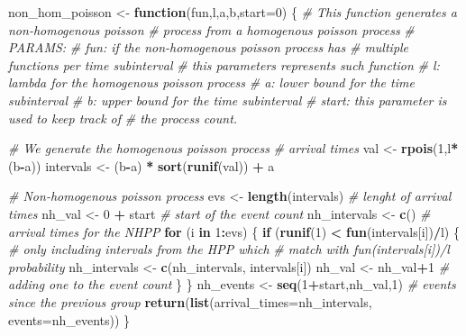 \documentclass[]{article}
\newenvironment{Shaded}{\begin{snugshade}}{\end{snugshade}}
\newcommand{\CommentTok}[1]{\textcolor[rgb]{0.56,0.35,0.01}{\textit{#1}}}
\newcommand{\ControlFlowTok}[1]{\textcolor[rgb]{0.13,0.29,0.53}{\textbf{#1}}}
\newcommand{\DataTypeTok}[1]{\textcolor[rgb]{0.13,0.29,0.53}{#1}}
\newcommand{\DecValTok}[1]{\textcolor[rgb]{0.00,0.00,0.81}{#1}}
\newcommand{\KeywordTok}[1]{\textcolor[rgb]{0.13,0.29,0.53}{\textbf{#1}}}
\newcommand{\NormalTok}[1]{#1}
\newcommand{\OperatorTok}[1]{\textcolor[rgb]{0.81,0.36,0.00}{\textbf{#1}}}
\newcommand{\StringTok}[1]{\textcolor[rgb]{0.31,0.60,0.02}{#1}}
\begin{document}
\begin{Shaded}
\begin{Highlighting}[]
\NormalTok{non_hom_poisson <-}\StringTok{ }\ControlFlowTok{function}\NormalTok{(fun,l,a,b,}\DataTypeTok{start=}\DecValTok{0}\NormalTok{) \{}
    \CommentTok{# This function generates a non-homogenous poisson }
    \CommentTok{# process from a homogenous poisson process}
    \CommentTok{# PARAMS:}
    \CommentTok{# fun:   if the non-homogenous poisson process has}
    \CommentTok{#        multiple functions per time subinterval}
    \CommentTok{#        this parameters represents such function}
    \CommentTok{# l:     lambda for the homogenous poisson process}
    \CommentTok{# a:     lower bound for the time subinterval}
    \CommentTok{# b:     upper bound for the time subinterval}
    \CommentTok{# start: this parameter is used to keep track of }
    \CommentTok{#        the process count.}
    
    \CommentTok{# We generate the homogenous poisson process }
    \CommentTok{# arrival times}
\NormalTok{    val <-}\StringTok{ }\KeywordTok{rpois}\NormalTok{(}\DecValTok{1}\NormalTok{,l}\OperatorTok{*}\NormalTok{(b}\OperatorTok{-}\NormalTok{a))}
\NormalTok{    intervals <-}\StringTok{ }\NormalTok{(b}\OperatorTok{-}\NormalTok{a) }\OperatorTok{*}\StringTok{ }\KeywordTok{sort}\NormalTok{(}\KeywordTok{runif}\NormalTok{(val)) }\OperatorTok{+}\StringTok{ }\NormalTok{a}

    \CommentTok{# Non-homogenous poisson process}
\NormalTok{    evs <-}\StringTok{ }\KeywordTok{length}\NormalTok{(intervals) }\CommentTok{# lenght of arrival times }
\NormalTok{    nh_val <-}\StringTok{ }\DecValTok{0} \OperatorTok{+}\StringTok{ }\NormalTok{start }\CommentTok{# start of the event count}
\NormalTok{    nh_intervals <-}\StringTok{ }\KeywordTok{c}\NormalTok{() }\CommentTok{# arrival times for the NHPP}
    \ControlFlowTok{for}\NormalTok{ (i }\ControlFlowTok{in} \DecValTok{1}\OperatorTok{:}\NormalTok{evs) \{}
        \ControlFlowTok{if}\NormalTok{ (}\KeywordTok{runif}\NormalTok{(}\DecValTok{1}\NormalTok{) }\OperatorTok{<}\StringTok{ }\KeywordTok{fun}\NormalTok{(intervals[i])}\OperatorTok{/}\NormalTok{l) \{ }
            \CommentTok{# only including intervals from the HPP which}
            \CommentTok{# match with fun(intervals[i])/l probability}
\NormalTok{            nh_intervals <-}\StringTok{ }\KeywordTok{c}\NormalTok{(nh_intervals, intervals[i]) }
\NormalTok{            nh_val <-}\StringTok{ }\NormalTok{nh_val}\OperatorTok{+}\DecValTok{1} \CommentTok{# adding one to the event count}
\NormalTok{        \}}
\NormalTok{    \}}
\NormalTok{    nh_events <-}\StringTok{ }\KeywordTok{seq}\NormalTok{(}\DecValTok{1}\OperatorTok{+}\NormalTok{start,nh_val,}\DecValTok{1}\NormalTok{) }\CommentTok{# events since the previous group}
    \KeywordTok{return}\NormalTok{(}\KeywordTok{list}\NormalTok{(}\DataTypeTok{arrival_times=}\NormalTok{nh_intervals, }\DataTypeTok{events=}\NormalTok{nh_events))}
\NormalTok{\}}
\end{Highlighting}
\end{Shaded}
\end{document}
